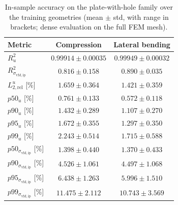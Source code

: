 \begin{table}[t]
\centering
\caption{In-sample accuracy on the plate-with-hole family over the training geometries (mean $\pm$ std, with range in brackets; dense evaluation on the full FEM mesh).}
\label{tab:plate_train_metrics}
\small
\begin{tabular}{lcc}
\toprule
Metric & Compression & Lateral bending \\
\midrule
$R^2_u$
& $0.99914 \pm 0.00035$ \; [$0.99786,\,0.99951$]
& $0.99949 \pm 0.00032$ \; [$0.99769,\,0.99975$] \\
$R^2_{\sigma_{\mathrm{vM,ip}}}$
& $0.816 \pm 0.158$ \; [$0.316,\,0.933$]
& $0.890 \pm 0.035$ \; [$0.799,\,0.933$] \\
$L_{2,\mathrm{rel}}^u$ [\%]
& $1.659 \pm 0.364$ \; [$1.241,\,2.894$]
& $1.421 \pm 0.359$ \; [$1.051,\,3.067$] \\
$p50_u$ [\%]
& $0.761 \pm 0.133$ \; [$0.598,\,1.220$]
& $0.572 \pm 0.118$ \; [$0.439,\,0.961$] \\
$p90_u$ [\%]
& $1.432 \pm 0.289$ \; [$1.082,\,2.560$]
& $1.107 \pm 0.270$ \; [$0.827,\,2.221$] \\
$p95_u$ [\%]
& $1.672 \pm 0.355$ \; [$1.251,\,3.046$]
& $1.297 \pm 0.350$ \; [$0.955,\,2.949$] \\
$p99_u$ [\%]
& $2.243 \pm 0.514$ \; [$1.592,\,3.927$]
& $1.715 \pm 0.588$ \; [$1.213,\,4.763$] \\
$p50_{\sigma_{\mathrm{vM,ip}}}$ [\%]
& $1.398 \pm 0.440$ \; [$0.976,\,3.519$]
& $1.370 \pm 0.433$ \; [$0.809,\,3.128$] \\
$p90_{\sigma_{\mathrm{vM,ip}}}$ [\%]
& $4.526 \pm 1.061$ \; [$3.373,\,9.106$]
& $4.497 \pm 1.068$ \; [$3.032,\,9.270$] \\
$p95_{\sigma_{\mathrm{vM,ip}}}$ [\%]
& $6.438 \pm 1.263$ \; [$4.380,\,11.548$]
& $5.996 \pm 1.510$ \; [$3.833,\,12.529$] \\
$p99_{\sigma_{\mathrm{vM,ip}}}$ [\%]
& $11.475 \pm 2.112$ \; [$8.007,\,19.122$]
& $10.743 \pm 3.569$ \; [$7.410,\,26.363$] \\
\bottomrule
\end{tabular}
\end{table}


